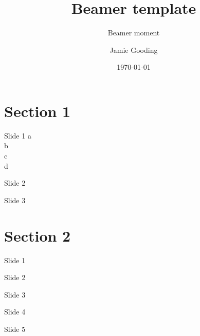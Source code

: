 \documentclass[12 pt, aspectratio=1610]{beamer}
\title{Beamer template}%
\subtitle{Beamer moment}
\author{Jamie Gooding}
\institute{Fakultät Physik, Technische Universit{\"a}t Dortmund}
\date{\today}
\begin{document}
\begin{frame}
    \maketitle
\end{frame}

\section{Section 1}

\begin{frame}{Slide 1}
    a\\
    b\\
    c\\
    d
\end{frame}

\begin{frame}{Slide 2}
    
\end{frame}

\begin{frame}{Slide 3}
    
\end{frame}

\section{Section 2}

\begin{frame}{Slide 1}
    
\end{frame}

\begin{frame}{Slide 2}
    
\end{frame}

\begin{frame}{Slide 3}
    
\end{frame}

\begin{frame}{Slide 4}
    
\end{frame}

\begin{frame}{Slide 5}
    
\end{frame}
\end{document}
